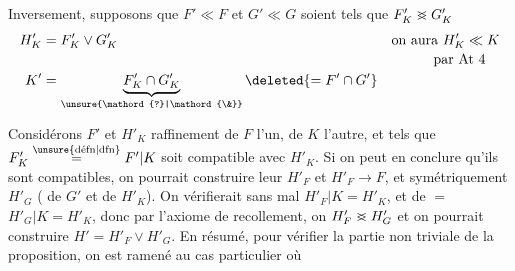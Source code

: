 Inversement, supposons que $F'\ll F$ et $G'\ll G$ soient tels que $F'_K\mathrel{>\mkern-14mu<}G'_K$  
\[
\begin{aligned}
H'_K&=F'_K\vee G'_K &&\text{on aura }H'_K\ll K\\[-.3ex]
&&&\hspace{3em}\text{par At 4}\\
K'&=\underbrace{F'_K\cap G'_K}_{\unsure{\mathord{?}|\mathord{\&}}}\deleted{=F'\cap G'}
\end{aligned}
\]

Considérons $F'$ et $H'_K$   raffinement de $F$ l'un, de $K$ l'autre, et tels que $F'_K\overset{\unsure{\text{défn}|\text{dfn}}}{=}F'|K$ soit compatible avec $H'_K$. Si on peut en conclure qu'ils sont compatibles, on pourrait construire leur  $H'_F$ et $H'_F\longrightarrow F$, et symétriquement $H'_G$ ( de $G'$ et de $H'_K$). On vérifierait sans mal $H'_F|K=H'_K$, et de $=$ $H'_G|K=H'_K$, donc par l'axiome de recollement, on  $H'_F\mathrel{>\mkern-14mu<}H'_G$ et on pourrait construire $H'=H'_F\vee H'_G$. En résumé, pour vérifier la partie non triviale de la proposition, on est ramené au cas particulier où
